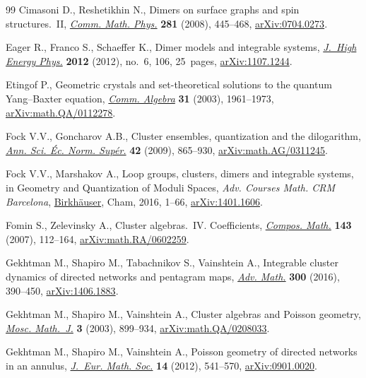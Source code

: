 \documentclass[pdftex]{sigma}
\numberwithin{equation}{section}
\begin{document}
\begin{thebibliography}{99}
Cimasoni D., Reshetikhin N., Dimers on surface graphs and spin
 structures.~{II},
 \href{https://doi.org/10.1007/s00220-008-0488-3}{\textit{Comm. Math. Phys.}}
 \textbf{281} (2008), 445--468,
 \href{http://arxiv.org/abs/0704.0273}{arXiv:0704.0273}.

Eager R., Franco S., Schaeffer K., Dimer models and integrable systems,
 \href{https://doi.org/10.1007/JHEP06(2012)106}{\textit{J.~High Energy Phys.}}
 \textbf{2012} (2012), no.~6, 106, 25~pages,
 \href{http://arxiv.org/abs/1107.1244}{arXiv:1107.1244}.

Etingof P., Geometric crystals and set-theoretical solutions to the quantum
 {Y}ang--{B}axter equation,
 \href{https://doi.org/10.1081/AGB-120018516}{\textit{Comm. Algebra}}
 \textbf{31} (2003), 1961--1973,
 \href{http://arxiv.org/abs/math.QA/0112278}{arXiv:math.QA/0112278}.

Fock V.V., Goncharov A.B., Cluster ensembles, quantization and the dilogarithm,
 \href{https://doi.org/10.24033/asens.2112}{\textit{Ann. Sci. \'Ec. Norm.
 Sup\'er.}} \textbf{42} (2009), 865--930,
 \href{http://arxiv.org/abs/math.AG/0311245}{arXiv:math.AG/0311245}.

Fock V.V., Marshakov A., Loop groups, clusters, dimers and integrable systems,
 in Geometry and Quantization of Moduli Spaces, \textit{Adv. Courses Math. CRM
 Barcelona}, \href{https://doi.org/10.1007/978-3-319-33578-0_1}{Birkh\"auser},
 Cham, 2016, 1--66, \href{http://arxiv.org/abs/1401.1606}{arXiv:1401.1606}.

Fomin S., Zelevinsky A., Cluster algebras.~{IV}. {C}oefficients,
 \href{https://doi.org/10.1112/S0010437X06002521}{\textit{Compos. Math.}}
 \textbf{143} (2007), 112--164,
 \href{http://arxiv.org/abs/math.RA/0602259}{arXiv:math.RA/0602259}.

Gekhtman M., Shapiro M., Tabachnikov S., Vainshtein A., Integrable cluster
 dynamics of directed networks and pentagram maps,
 \href{https://doi.org/10.1016/j.aim.2016.03.023}{\textit{Adv. Math.}}
 \textbf{300} (2016), 390--450,
 \href{http://arxiv.org/abs/1406.1883}{arXiv:1406.1883}.

Gekhtman M., Shapiro M., Vainshtein A., Cluster algebras and {P}oisson
 geometry,
 \href{https://doi.org/10.17323/1609-4514-2003-3-3-899-934}{\textit{Mosc.
 Math.~J.}} \textbf{3} (2003), 899--934,
 \href{http://arxiv.org/abs/math.QA/0208033}{arXiv:math.QA/0208033}.

Gekhtman M., Shapiro M., Vainshtein A., Poisson geometry of directed networks
 in an annulus, \href{https://doi.org/10.4171/JEMS/311}{\textit{J.~Eur. Math.
 Soc.}} \textbf{14} (2012), 541--570,
 \href{http://arxiv.org/abs/0901.0020}{arXiv:0901.0020}.


\end{thebibliography}
\end{document}

